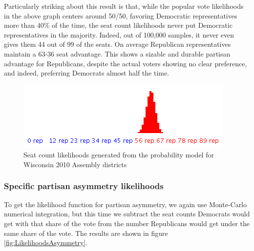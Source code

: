 \documentclass[preprint,12pt]{article}
\begin{document}
Particularly striking about this result is that, while the popular vote likelihoods in the above graph centers around 50/50, favoring Democratic representatives more than 40\% of the time, the seat count likelihoods never put Democratic representatives in the majority.  Indeed, out of 100,000 samples, it never even gives them 44 out of 99 of the seats.  On average Republican representatives maintain a 63-36 seat advantage.   This shows a sizable and durable partisan advantage for Republicans, despite the actual voters showing no clear preference, and indeed, preferring Democrats almost half the time.

\begin{figure}[htb!]
    \begin{center}
        \includegraphics[scale=0.6]{../Figures/WI2010/seat_count_likelihoods.png}
        \caption{Seat count likelihoods generated from the probability model for Wisconsin 2010 Assembly districts}\label{fig:LikelihoodsSeatCounts}
    \end{center}
\end{figure}
 

\subsubsection{Specific partisan asymmetry likelihoods}
 
To get the likelihood function for partisan asymmetry, we again use Monte-Carlo numerical integration, but this time we subtract the seat counts Democrats would get with that share of the vote from the number Republicans would get under the same share of the vote. The results are shown in figure \ref{fig:LikelihoodsAsymmetry}.
 
\end{document}
